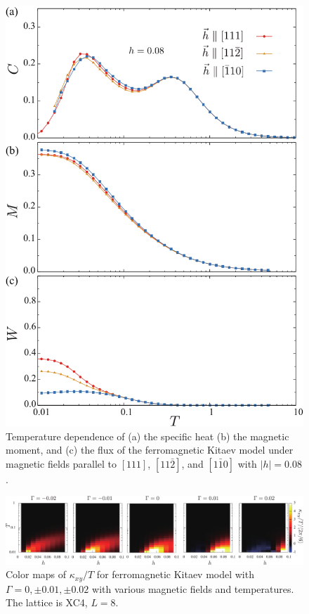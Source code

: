 \documentclass[reprint,amsmath,amssymb,aps,prx]{revtex4-2}
\begin{document}
\begin{figure}
  \begin{center}
    \includegraphics[width=0.9\linewidth]{plot_CMF_h0.08_ab.pdf}
  \end{center}
  \caption{Temperature dependence of (a) the specific heat (b) the magnetic moment, and (c) the flux of the ferromagnetic Kitaev model under magnetic fields parallel to $[111]$, $[11\bar{2}]$, and $[1\bar{1}0]$ with $|h|=0.08$.}
  \label{fig:CMF_h0.08_ab}
\end{figure}


\begin{figure}
  \begin{center}
    \includegraphics[width=\linewidth]{color_map_G_XC4.pdf}
  \end{center}
  \caption{Color maps of $\kappa_{xy}/T$ for ferromagnetic Kitaev model with $\Gamma = 0, \pm 0.01, \pm 0.02$ with various magnetic fields and temperatures. The lattice is XC4, $L=8$.}
  \label{fig:color_map_G_XC4}
\end{figure}
\end{document}

